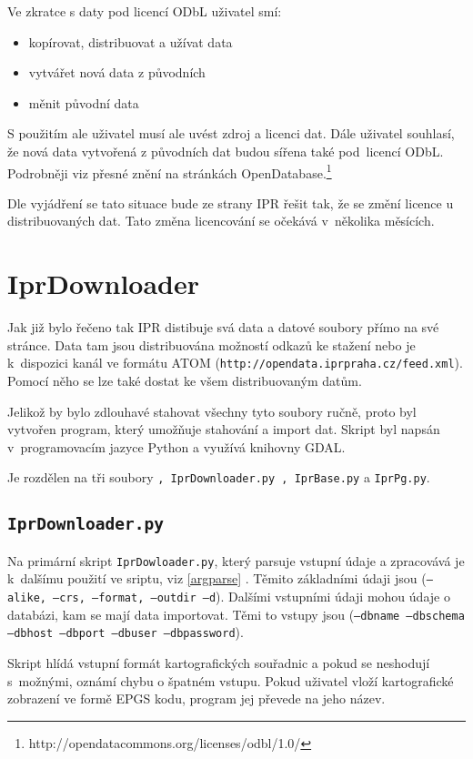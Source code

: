 Ve zkratce s daty pod licencí ODbL uživatel smí:
\begin{itemize}
    \item    kopírovat, distribuovat a užívat data
    \item    vytvářet nová data z původních
    \item    měnit původní data
\end{itemize}

S použitím ale uživatel musí ale uvést zdroj a licenci dat.
Dále uživatel souhlasí, že nová data vytvořená z původních dat budou sířena
také pod~licencí ODbL.
Podrobněji viz přesné znění na stránkách OpenDatabase.\footnote{http://opendatacommons.org/licenses/odbl/1.0/}

Dle vyjádření se tato situace bude ze strany IPR řešit tak, že se změní 
licence u distribuovaných dat. Tato změna licencování se očekává 
v~několika měsících.




\section{IprDownloader}
\label{Iprdownloader}
Jak již bylo řečeno tak IPR distibuje svá data a datové soubory přímo na své 
stránce. Data tam jsou distribuována možností odkazů ke stažení nebo je
k~dispozici kanál ve formátu ATOM ({\tt http://opendata.iprpraha.cz/feed.xml}).
Pomocí něho se lze také dostat ke všem distribuovaným datům.

Jelikož by bylo zdlouhavé stahovat všechny tyto soubory ručně, proto byl
vytvořen program, který umožňuje stahování a import dat. Skript byl napsán
v~programovacím jazyce Python a využívá knihovny GDAL.

Je rozdělen na tři soubory 
{\tt , IprDownloader.py , IprBase.py} a {\tt IprPg.py}.


\subsection{{\tt IprDownloader.py}}
Na primární skript {\tt IprDowloader.py}, který parsuje vstupní údaje a
zpracovává je k~dalšímu použití ve sriptu, viz \ref{argparse} .
Těmito základními údaji jsou
({\tt ---alike, ---crs, ---format, ---outdir ---d}). Dalšími vstupními údaji mohou
údaje o databázi, kam se mají data importovat. Těmi to vstupy jsou
({\tt ---dbname ---dbschema ---dbhost ---dbport ---dbuser ---dbpassword}).

Skript hlídá vstupní formát kartografických souřadnic a pokud se neshodují
s~možnými, oznámí chybu o špatném vstupu. Pokud uživatel vloží kartografické
zobrazení ve formě EPGS kodu, program jej převede na jeho název.


